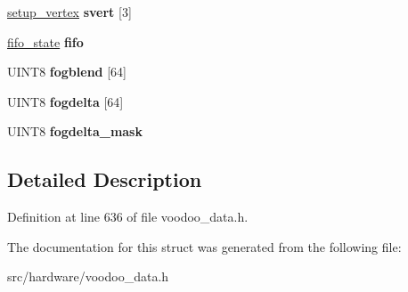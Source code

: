 \begin{DoxyCompactItemize}
\item 
\hypertarget{struct__fbi__state_a3b6fb61aa6914282d9eda86e9a5d60c1}{\hyperlink{struct__setup__vertex}{setup\-\_\-vertex} {\bfseries svert} \mbox{[}3\mbox{]}}\label{struct__fbi__state_a3b6fb61aa6914282d9eda86e9a5d60c1}

\item 
\hypertarget{struct__fbi__state_ad3a68c4725e83f6b7bf4d1b1aa0002f7}{\hyperlink{struct__fifo__state}{fifo\-\_\-state} {\bfseries fifo}}\label{struct__fbi__state_ad3a68c4725e83f6b7bf4d1b1aa0002f7}

\item 
\hypertarget{struct__fbi__state_a1f3e60e9b3fe9660c79dd41c8d781627}{U\-I\-N\-T8 {\bfseries fogblend} \mbox{[}64\mbox{]}}\label{struct__fbi__state_a1f3e60e9b3fe9660c79dd41c8d781627}

\item 
\hypertarget{struct__fbi__state_aba86620bccb8c8436944eace32f6d077}{U\-I\-N\-T8 {\bfseries fogdelta} \mbox{[}64\mbox{]}}\label{struct__fbi__state_aba86620bccb8c8436944eace32f6d077}

\item 
\hypertarget{struct__fbi__state_a225bf096fa11d32f29adb6f9b3ede5d4}{U\-I\-N\-T8 {\bfseries fogdelta\-\_\-mask}}\label{struct__fbi__state_a225bf096fa11d32f29adb6f9b3ede5d4}

\end{DoxyCompactItemize}


\subsection{Detailed Description}


Definition at line 636 of file voodoo\-\_\-data.\-h.



The documentation for this struct was generated from the following file\-:\begin{DoxyCompactItemize}
\item 
src/hardware/voodoo\-\_\-data.\-h\end{DoxyCompactItemize}

